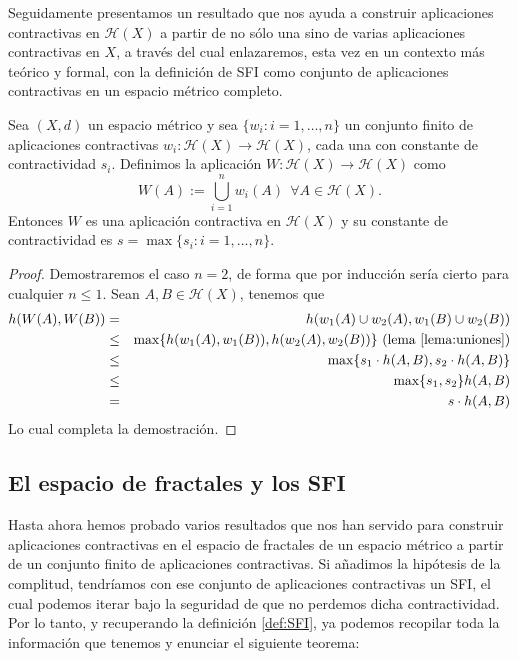 Seguidamente presentamos un resultado que nos ayuda a construir aplicaciones contractivas en $\mathcal{H}(X)$ a partir de no sólo una sino de varias aplicaciones contractivas en $X$, a través del cual enlazaremos, esta vez en un contexto más teórico y formal, con la definición de SFI como conjunto de aplicaciones contractivas en un espacio métrico completo.

\begin{proposicion}
    Sea $(X,d)$ un espacio métrico y sea $\{w_i:i=1,\dots,n\}$ un conjunto finito de aplicaciones contractivas $w_i:\mathcal{H}(X)\longrightarrow\mathcal{H}(X)$, cada una con constante de contractividad $s_i$. Definimos la aplicación $W:\mathcal{H}(X)\longrightarrow\mathcal{H}(X)$ como
    \begin{equation}
        \label{eqn:W}
        W(A) := \bigcup_{i=1}^n w_i(A) \ \ \forall A\in\mathcal{H}(X).
    \end{equation}
    Entonces $W$ es una aplicación contractiva en $\mathcal{H}(X)$ y su constante de contractividad es $s=\max\{s_i:i=1,\dots,n\}$.
\end{proposicion}
\begin{proof}
    Demostraremos el caso $n=2$, de forma que por inducción sería cierto para cualquier $n\leq 1$. Sean $A,B\in\mathcal{H}(X)$, tenemos que
    \begin{eqnarray*}
    h(W(A),W(B)) & = & h(w_1(A)\cup w_2(A), w_1(B)\cup w_2(B)) \\
                 & \leq & \max\{h(w_1(A),w_1(B)), h(w_2(A),w_2(B))\}\text{ (lema \ref{lema:uniones})} \\
                 & \leq & \max\{s_1\cdot h(A,B), s_2\cdot h(A,B) \} \\
                 & \leq & \max\{s_1,s_2\} h(A,B) \\
                 & = & s \cdot h(A,B)
    \end{eqnarray*}
    Lo cual completa la demostración.
\end{proof}

\subsection{El espacio de fractales y los SFI}

Hasta ahora hemos probado varios resultados que nos han servido para construir aplicaciones contractivas en el espacio de fractales de un espacio métrico a partir de un conjunto finito de aplicaciones contractivas. Si añadimos la hipótesis de la complitud, tendríamos con ese conjunto de aplicaciones contractivas un SFI, el cual podemos iterar bajo la seguridad de que no perdemos dicha contractividad. Por lo tanto, y recuperando la definición \ref{def:SFI}, ya podemos recopilar toda la información que tenemos y enunciar el siguiente teorema:

